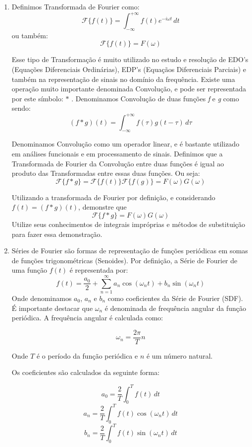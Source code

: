 \documentclass[11pt,a4paper]{article}
\newcommand{\integral}{\displaystyle\int}
\newcommand{\somatorio}{\displaystyle\sum}
\begin{document}
\begin{enumerate}
		
		\item Definimos Transformada de Fourier como: 
		$$\mathscr{F}\{f(t)\} = \integral_{-\infty}^{+\infty} f(t) e^{-i\omega t} \, dt$$ ou também: 
		$$\mathscr{F}\{f(t)\}=F(\omega)$$
		
		Esse tipo de Transformação é muito utilizado no estudo e resolução de EDO's (Equações Diferenciais
		Ordinárias), EDP's (Equaçãos Diferenciais Parciais) e também na representação de sinais no domínio 				da frequência. Existe uma operação muito
		importante denominada Convolução, e pode ser representada por este símbolo: $\ast$ . Denominamos 
		Convolução de duas funções \textit{f} e \textit{g} como sendo:
		$$(f \ast g)(t) = \integral_{-\infty}^{+\infty} f(\tau)g(t - \tau) \, d\tau$$
		
		Denominamos Convolução como um operador linear, e é bastante utilizado em análises funcionais e em 
		processamento de sinais. Definimos que a Transformada de Fourier da Convolução entre duas funções
		é igual ao produto das Transformadas entre essas duas funções. Ou seja:
		$$\mathscr{F}\{f \ast g\} = \mathscr{F}\{f(t)\}\mathscr{F}\{f(g)\} = F(\omega)G(\omega)$$
		
		Utilizando a transformada de Fourier por definição, e considerando $f(t) = (f \ast g)(t)$, 						demonstre que
		$$\mathscr{F}\{f \ast g\} = F(\omega)G(\omega)$$ 
		Utilize seus conhecimentos de integrais impróprias e métodos de substituição para fazer essa 					demonstração.
		
		\item Séries de Fourier são formas de representação de funções periódicas em somas de funções 					trigonométricas (Senoides). Por definição, a Série de Fourier de uma função $f(t)$ é representada 				por:
		$$f(t)= \frac{a_0}{2} + \somatorio_{n=1}^{\infty} a_n \cos(\omega_n t) + b_n \sin(\omega_n t) $$
		Onde denominamos $a_0$, $a_n$ e $b_n$ como coeficientes da Série de Fourier (SDF). É 
		importante destacar que $\omega_n$ é denominada de frequência angular da função periódica. 
		A frequência angular é calculada como:
		
		$$\omega_n = \frac{2\pi}{T}n $$
		
		Onde $T$ é o período da função periódica e $n$ é um número natural.  
		
		Os coeficientes são calculados da seguinte forma:
		
		$$a_0 = \frac{2}{T}\integral_0^{T} f(t) \, dt $$ 
		$$a_n = \frac{2}{T}\integral_0^{T} f(t) \cos(\omega_n t) \, dt $$ 
		$$b_n = \frac{2}{T}\integral_0^{T} f(t) \sin(\omega_n t) \, dt $$ 
		

\end{enumerate}
\end{document}
